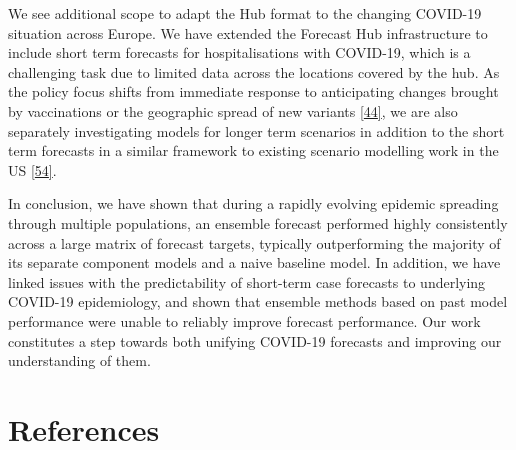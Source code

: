 \documentclass[
]{article}
\begin{document}
We see additional scope to adapt the Hub format to the changing COVID-19 situation across Europe. We have extended the Forecast Hub infrastructure to include short term forecasts for hospitalisations with COVID-19, which is a challenging task due to limited data across the locations covered by the hub. As the policy focus shifts from immediate response to anticipating changes brought by vaccinations or the geographic spread of new variants \protect\hyperlink{ref-europeancentrefordiseasepreventionandcontrolOverviewImplementationCOVID192021}{{[}44{]}}, we are also separately investigating models for longer term scenarios in addition to the short term forecasts in a similar framework to existing scenario modelling work in the US \protect\hyperlink{ref-borcheringModelingFutureCOVID192021}{{[}54{]}}.

In conclusion, we have shown that during a rapidly evolving epidemic spreading through multiple populations, an ensemble forecast performed highly consistently across a large matrix of forecast targets, typically outperforming the majority of its separate component models and a naive baseline model. In addition, we have linked issues with the predictability of short-term case forecasts to underlying COVID-19 epidemiology, and shown that ensemble methods based on past model performance were unable to reliably improve forecast performance. Our work constitutes a step towards both unifying COVID-19 forecasts and improving our understanding of them.

\hypertarget{references}{%
\section{References}\label{references}}
\end{document}
